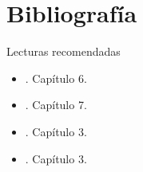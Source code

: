 \documentclass[9pt, aspectratio=169]{beamer}
\begin{document}
\section*{Bibliografía}
\begin{frame}[allowframebreaks]{Lecturas recomendadas}
\begin{itemize}
    \item {}. Capítulo 6.
    \item {}. Capítulo 7.
    \item {}. Capítulo 3.
    \item {}. Capítulo 3.
\end{itemize}
\end{frame}
\end{document}

